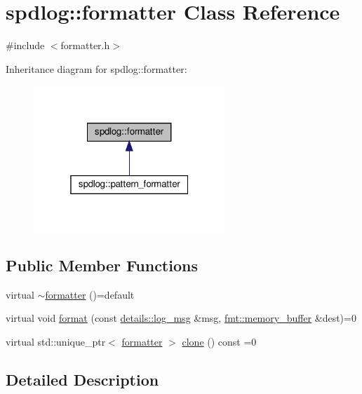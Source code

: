 \hypertarget{classspdlog_1_1formatter}{}\section{spdlog\+:\+:formatter Class Reference}
\label{classspdlog_1_1formatter}


{\ttfamily \#include $<$formatter.\+h$>$}



Inheritance diagram for spdlog\+:\+:formatter\+:
\nopagebreak
\begin{figure}[H]
\begin{center}
\leavevmode
\includegraphics[width=205pt]{classspdlog_1_1formatter__inherit__graph}
\end{center}
\end{figure}
\subsection*{Public Member Functions}
\begin{DoxyCompactItemize}
\item 
virtual \hyperlink{classspdlog_1_1formatter_a63ee38e660519d09020b21dd7d54d4fe}{$\sim$formatter} ()=default
\item 
virtual void \hyperlink{classspdlog_1_1formatter_ad50e2b119d08fad952b0f885455b3bee}{format} (const \hyperlink{structspdlog_1_1details_1_1log__msg}{details\+::log\+\_\+msg} \&msg, \hyperlink{format_8h_a21cbf729f69302f578e6db21c5e9e0d2}{fmt\+::memory\+\_\+buffer} \&dest)=0
\item 
virtual std\+::unique\+\_\+ptr$<$ \hyperlink{classspdlog_1_1formatter}{formatter} $>$ \hyperlink{classspdlog_1_1formatter_ae9857a794904d98a4a9527a742e37129}{clone} () const =0
\end{DoxyCompactItemize}


\subsection{Detailed Description}


